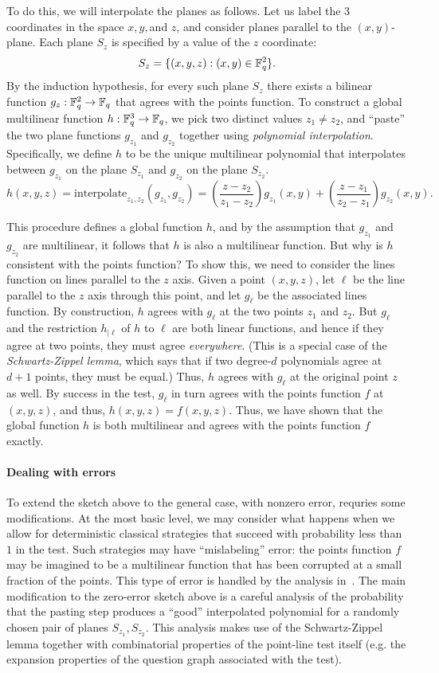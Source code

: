 To do this, we will interpolate the planes as follows. Let us label
the 3 coordinates in the space $x, y, $and $z$, and consider planes
parallel to the $(x,y)$-plane. Each plane $S_z$ is specified by a
value of the $z$ coordinate:
\[ S_z = \{(x,y,z): (x, y) \in \mathbb F_q^2\}. \]
By the induction hypothesis, for every such plane $S_z$ there exists a
bilinear function $g_{z}: \mathbb F_q^{2} \to \mathbb F_q$ that agrees with the
points function. To construct a global multilinear function $h:
\mathbb F_q^3 \to \mathbb F_q$, we pick two distinct values $z_1 \neq z_2$, and ``paste''
the two plane functions $g_{z_1} $ and
$g_{z_2}$ together using \emph{polynomial
  interpolation}. Specifically, we define $h$ to be the unique
multilinear polynomial that interpolates between $g_{z_1}$ on the
plane $S_{z_1}$ and $g_{z_2}$ on the plane $S_{z_2}$.
\[ h(x,y,z) = \mathrm{interpolate}_{z_1, z_2}(g_{z_1}, g_{z_2}) = \left(\frac{z - z_2}{z_1 - z_2}\right) g_{z_1}(x,y) +
  \left(\frac{z - z_1}{z_2 - z_1}\right) g_{z_2}(x,y). \]

This procedure defines a global function $h$, and by the assumption
that $g_{z_1}$ and $g_{z_2}$ are multilinear, it follows that $h$ is
also a multilinear function. But why is $h$ consistent with the points
function? To show this, we need to consider the lines function on
lines parallel to the $z$ axis. Given a point $(x,y,z)$, let $\ell$ be
the line parallel to the $z$ axis through this point, and let $g_\ell$
be the associated lines function. By construction, $h$ agrees with
$g_\ell$ at the two points $z_1$ and $z_2$. But $g_\ell$ and the restriction
$h_{|\ell}$ of $h$ to $\ell$ are both linear functions, and hence if
they agree at two points, they must agree \emph{everywhere}. (This is
a special case of the \emph{Schwartz-Zippel lemma}, which says that if
two degree-$d$ polynomials agree at $d+1$ points, they must be equal.)
Thus, $h$
agrees with $g_\ell$ at the original point $z$ as well. By success in
the test, $g_\ell$ in turn agrees with the points function $f$ at
$(x,y,z)$, and thus, $h(x,y,z) = f(x,y,z)$. Thus, we have shown that
the global function $h$ is both multilinear and agrees with the points
function $f$ exactly.


\paragraph{Dealing with errors}
To extend the sketch above to the general case, with nonzero error,
requries some modifications. At the most basic level, we may consider
what happens when we allow for deterministic classical strategies that
succeed with probability less than $1$ in the test. Such strategies
may have ``mislabeling'' error: the points function
$f$ may be imagined to be a multilinear function that has been
corrupted at a small fraction of the points. This type of error is
handled by the analysis in~\cite{BFL91}. The main modification to the zero-error
sketch above is a careful analysis of the probability that the pasting
step produces a ``good'' interpolated polynomial for a randomly chosen
pair of planes $S_{z_1}, S_{z_2}$. This analysis makes use of the
Schwartz-Zippel lemma together with combinatorial properties of the
point-line test itself (e.g. the expansion properties of the question
graph associated with the test).

